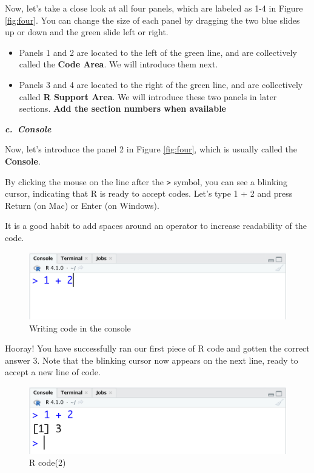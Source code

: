 \documentclass[
]{book}
\newenvironment{infobox}[1]
  {
  \begin{itemize}
  \renewcommand{\labelitemi}{
    \raisebox{-.7\height}[0pt][0pt]{
      {\setkeys{Gin}{width=3em,keepaspectratio}
        \texttt{[image: pics/\#1]}}
    }
  }
  \setlength{\fboxsep}{1em}
  \begin{blackbox}
  \item
  }
  {
  \end{blackbox}
  \end{itemize}
  }
\newenvironment{blackbox}{
  \definecolor{shadecolor}{rgb}{0, 0, 0}  %
  \color{white}
  \begin{shaded}}
 {\end{shaded}}
\begin{document}
Now, let's take a close look at all four panels, which are labeled as 1-4 in Figure \ref{fig:four}. You can change the size of each panel by dragging the two blue slides up or down and the green slide left or right.

\begin{itemize}
\item
  Panels 1 and 2 are located to the left of the green line, and are collectively called the \textbf{Code Area}. We will introduce them next.
\item
  Panels 3 and 4 are located to the right of the green line, and are collectively called \textbf{R Support Area}. We will introduce these two panels in later sections. \textbf{Add the section numbers when available}
\end{itemize}

\textbf{\emph{c.~Console}}

Now, let's introduce the panel 2 in Figure \ref{fig:four}, which is usually called the \textbf{Console}.

By clicking the mouse on the line after the \texttt{\textgreater{}} symbol, you can see a blinking cursor, indicating that R is ready to accept codes. Let's type 1 + 2 and press Return (on Mac) or Enter (on Windows).

\begin{infobox}{caution}
It is a good habit to add spaces around an operator to increase readability of the code.

\end{infobox}

\begin{figure}

{\centering \includegraphics[width=0.7\linewidth]{pics/1code} 

}

\caption{Writing code in the console}\label{fig:code}
\end{figure}

Hooray! You have successfully ran our first piece of R code and gotten the correct answer 3. Note that the blinking cursor now appears on the next line, ready to accept a new line of code.

\begin{figure}

{\centering \includegraphics[width=0.7\linewidth]{pics/1answer} 

}

\caption{R code(2)}\label{fig:answer}
\end{figure}
\end{document}

